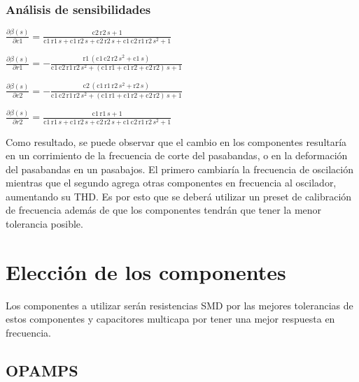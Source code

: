 \documentclass[../../tc_tp6_main.tex]{subfiles}
\begin{document}
\subsubsection{Análisis de sensibilidades}

$\frac{\partial \beta (s)}{\partial c1} = \frac{\mathrm{c2}\, \mathrm{r2}\, s + 1}{\mathrm{c1}\, \mathrm{r1}\, s + \mathrm{c1}\, \mathrm{r2}\, s + \mathrm{c2}\, \mathrm{r2}\, s + \mathrm{c1}\, \mathrm{c2}\, \mathrm{r1}\, \mathrm{r2}\, s^2 + 1}$\par
$\frac{\partial \beta (s)}{\partial r1} = -\frac{\mathrm{r1}\, \left(\mathrm{c1}\, \mathrm{c2}\, \mathrm{r2}\, s^2 + \mathrm{c1}\, s\right)}{\mathrm{c1}\, \mathrm{c2}\, \mathrm{r1}\, \mathrm{r2}\, s^2 + \left(\mathrm{c1}\, \mathrm{r1} + \mathrm{c1}\, \mathrm{r2} + \mathrm{c2}\, \mathrm{r2}\right)\, s + 1}$\par
$\frac{\partial \beta (s)}{\partial c2} = -\frac{\mathrm{c2}\, \left(\mathrm{c1}\, \mathrm{r1}\, \mathrm{r2}\, s^2 + \mathrm{r2}\, s\right)}{\mathrm{c1}\, \mathrm{c2}\, \mathrm{r1}\, \mathrm{r2}\, s^2 + \left(\mathrm{c1}\, \mathrm{r1} + \mathrm{c1}\, \mathrm{r2} + \mathrm{c2}\, \mathrm{r2}\right)\, s + 1}$\par
$\frac{\partial \beta (s)}{\partial r2} = \frac{\mathrm{c1}\, \mathrm{r1}\, s + 1}{\mathrm{c1}\, \mathrm{r1}\, s + \mathrm{c1}\, \mathrm{r2}\, s + \mathrm{c2}\, \mathrm{r2}\, s + \mathrm{c1}\, \mathrm{c2}\, \mathrm{r1}\, \mathrm{r2}\, s^2 + 1}$\par

Como resultado, se puede observar que el cambio en los componentes resultaría en un corrimiento de la frecuencia de corte del pasabandas, o en la deformación del pasabandas en un pasabajos. El primero cambiaría la frecuencia de oscilación mientras que el segundo agrega otras componentes en frecuencia al oscilador, aumentando su THD. Es por esto que se deberá utilizar un preset de calibración de frecuencia además de que los componentes tendrán que tener la menor tolerancia posible.
\section{Elección de los componentes}

Los componentes a utilizar serán resistencias SMD por las mejores tolerancias de estos componentes y capacitores multicapa por tener una mejor respuesta en frecuencia.

\subsection{OPAMPS}
\end{document}
